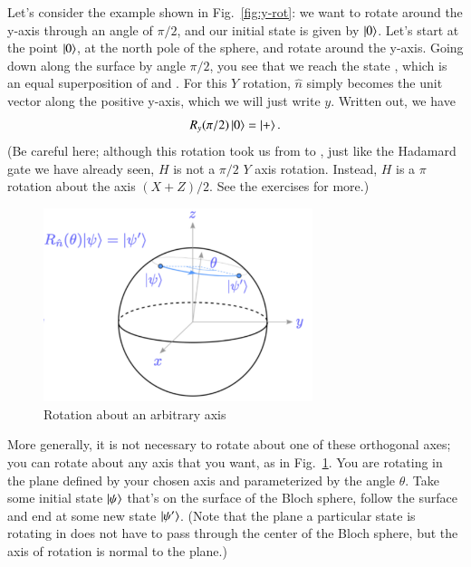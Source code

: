Let's consider the example shown in Fig.~\ref{fig:y-rot}: we want to rotate around the y-axis through an angle of $\pi/2$, and our initial state is given by $\left| 0 \right\rangle$.  Let's start at the point $\left| 0 \right\rangle$, at the north pole of the sphere, and rotate around the y-axis. Going down along the surface by angle $\pi/2$, you see that we reach the state \ket{+}, which is an equal superposition of  and .  For this $Y$ rotation, $\hat{n}$ simply becomes the unit vector along the positive y-axis, which we will just write $y$. Written out, we have
\begin{equation}
R_{y}(\pi / 2)\left| 0 \right\rangle=\left| + \right\rangle.
\end{equation}
(Be careful here; although this rotation took us from  to \ket{+}, just like the Hadamard gate we have already seen, $H$ is not a $\pi/2$ $Y$ axis rotation.  Instead, $H$ is a $\pi$ rotation about the axis $(X+Z)/2$. See the exercises for more.)

\begin{figure}[H]
    \centering
    \includegraphics[width=0.7\textwidth]{lesson2/bloch_general_axis.pdf}
    
        \caption{Rotation about an arbitrary axis}
    
    \label{fig:arb-rot}
\end{figure}

More generally, it is not necessary to rotate about one of these orthogonal axes; you can rotate about any axis that you want, as in Fig.~\ref{fig:arb-rot}. You are rotating in the plane defined by your chosen axis and parameterized by the angle $\theta$. Take some initial state $\left| \psi \right\rangle$ that's on the surface of the Bloch sphere, follow the surface and end at some new state $\left| \psi' \right\rangle$.  (Note that the plane a particular state is rotating in does not have to pass through the center of the Bloch sphere, but the axis of rotation is normal to the plane.) 


